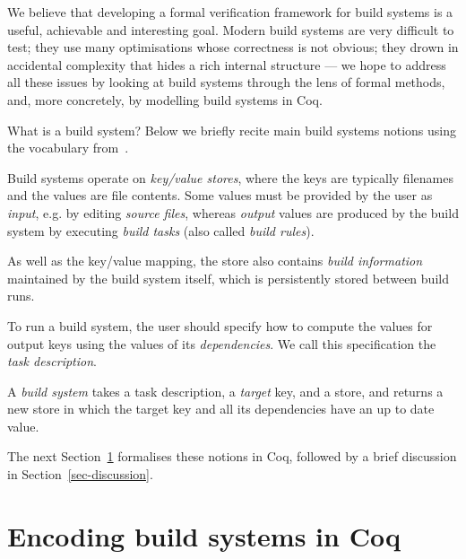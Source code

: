 \documentclass[sigplan,review]{acmart}\settopmatter{printfolios=true,printccs=false,printacmref=false}
\begin{document}
We believe that developing a formal verification framework for build systems
is a useful, achievable and interesting goal. Modern build systems are
very difficult to test; they use many optimisations whose correctness is not
obvious; they drown in accidental complexity that hides a rich internal
structure --- we hope to address all these issues by looking at build systems
through the lens of formal methods, and, more concretely, by modelling build
systems in Coq.

What is a build system? Below we briefly recite main build systems notions
using the vocabulary from~\cite{Mokhov2018icfp}.

Build systems operate on \emph{key/value stores}, where the keys are typically
filenames and the values are file contents. Some values must be provided by
the user as \emph{input}, e.g. by editing \emph{source files}, whereas
\emph{output} values are produced by the build system by executing \emph{build
tasks} (also called \emph{build rules}).

As well as the key/value mapping, the store also contains \emph{build
information} maintained by the build system itself, which is persistently stored
between build runs.

To run a build system, the user should specify how to compute the values for
output keys using the values of its \emph{dependencies}. We call this
specification the \emph{task description}.

A \emph{build system} takes a task description, a \emph{target} key, and a
store, and returns a new store in which the target key and all its dependencies
have an up to date value.

The next Section~\ref{sec-abstractions} formalises these notions in Coq,
followed by a brief discussion in Section~\ref{sec-discussion}.

\vspace{-3mm}
\section{Encoding build systems in Coq}\label{sec-abstractions}
\vspace{-1mm}
\end{document}
